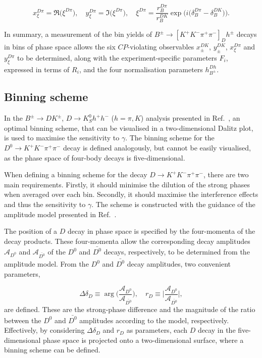 \documentclass[12pt, a4paper, notitlepage, onecolumn]{article}
\begin{document}
\begin{equation}
    x_\xi^{D\pi} = \Re\big(\xi^{D\pi}\big), \quad y_\xi^{D\pi} = \Im\big(\xi^{D\pi}\big), \quad \xi^{D\pi} = \frac{r_B^{D\pi}}{r_B^{DK}}\exp\Big(i\big(\delta_B^{D\pi} - \delta_B^{DK}\big)\Big).
\end{equation}

In summary, a measurement of the bin yields of $B^\pm\to[K^+K^-\pi^+\pi^-]_D h^\pm$ decays in bins of phase space allows the six $C\!P$-violating observables $x_\pm^{DK}$, $y_\pm^{DK}$, $x_\xi^{D\pi}$ and $y_\xi^{D\pi}$ to be determined, along with the experiment-specific parameters $F_i$, expressed in terms of $R_i$, and the four normalisation parameters $h_{B^\pm}^{D h}$.

\subsection{Binning scheme}
\label{section:Binning_scheme}
In the $B^\pm\to DK^\pm$, $D\to K^0_S h^+h^-$ ($h=\pi, K$) analysis presented in Ref.~\cite{LHCb-PAPER-2020-019}, an optimal binning scheme, that can be visualised in a two-dimensional Dalitz plot, is used to maximise the sensitivity to $\gamma$. The binning scheme for the $D^0\to K^+K^-\pi^+\pi^-$ decay is defined analogously, but cannot be easily visualised, as the phase space of four-body decays is five-dimensional.

When defining a binning scheme for the decay $D\to K^+K^-\pi^+\pi^-$, there are two main requirements. Firstly, it should minimise the dilution of the strong phases when averaged over each bin. Secondly, it should maximise the interference effects and thus the sensitivity to $\gamma$. The scheme is constructed with the guidance   of the amplitude model presented in Ref.~\cite{LHCb-PAPER-2018-041}.
 
The position of a $D$ decay in phase space is specified by the four-momenta of the decay products.  These four-momenta allow the corresponding decay amplitudes $\mathcal{A}_{D^0}$ and $\mathcal{A}_{\bar{D^0}}$ of the $D^0$ and $\bar{D^0}$ decays, respectively, to be determined from the amplitude model.  From the $D^0$ and $\bar{D^0}$ decay amplitudes, two convenient parameters,

\begin{equation}
    \Delta\delta_D\equiv\arg\Big(\frac{\mathcal{A}_{D^0}}{\mathcal{A}_{\bar{D^0}}}\Big), \quad r_D\equiv\Big\lvert\frac{\mathcal{A}_{D^0}}{\mathcal{A}_{\bar{D^0}}}\Big\rvert,
\end{equation}
are defined. These are the strong-phase difference and the magnitude of the ratio between the $D^0$ and $\bar{D^0}$ amplitudes according to the model, respectively. Effectively, by considering $\Delta\delta_D$ and $r_D$ as parameters, each $D$ decay in the five-dimensional phase space is projected onto a two-dimensional surface, where a binning scheme can be defined.
\end{document}
